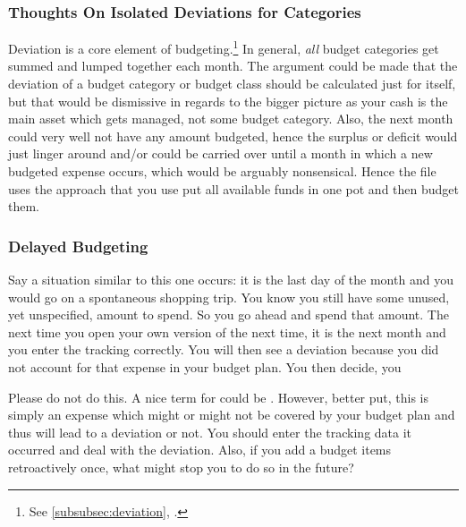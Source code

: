 \subsubsection{Thoughts On Isolated Deviations for Categories}
\label{subsubsec:thoughts-on-isolated-deviations-for-categories}

Deviation is a core element of budgeting.\footnote{See \autoref{subsubsec:deviation}, .}
In general, \emph{all} budget categories get summed and lumped together each month.
The argument could be made that the deviation of a budget category or budget class should be calculated just for itself, but that would be dismissive in regards to the bigger picture as your cash is the main asset which gets managed, not some budget category.
Also, the next month could very well not have any amount budgeted, hence the surplus or deficit would just linger around and/or could be carried over until a month in which a new budgeted expense occurs, which would be arguably nonsensical.
Hence the file uses the approach that you use put all available funds in one pot and then budget them.

\subsubsection{Delayed Budgeting}
\label{subsubsec:delayed-budgeting}

Say a situation similar to this one occurs:
it is the last day of the month and you would go on a spontaneous shopping trip.
You know you still have some unused, yet unspecified, amount to spend.
So you go ahead and spend that amount.
The next time you open your own version of \tfn the next time, it is the next month and you enter the tracking correctly.
You will then see a deviation because you did not account for that expense in your budget plan.
You then decide, you 

Please do not do this.
A nice term for could be .
However, better put, this is simply an expense which might or might not be covered by your budget plan and thus will lead to a deviation or not.
You should enter the tracking data it occurred and deal with the deviation.
Also, if you add a budget items retroactively once, what might stop you to do so in the future?